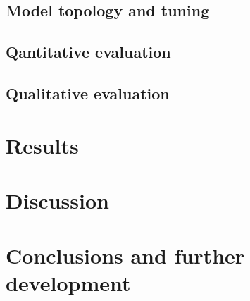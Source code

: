 \documentclass{article}
\begin{document}
    \subsection{Model topology and tuning}
    
    \subsection{Qantitative evaluation}
    
    \subsection{Qualitative evaluation}
    
    \section{Results}
    
    \section{Discussion}
    
    \section{Conclusions and further development}

    \printbibliography
\end{document}
